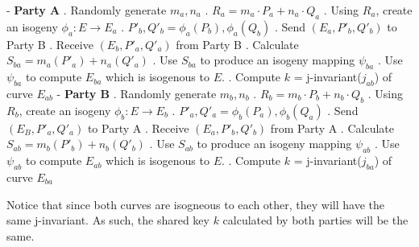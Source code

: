 \documentclass[10pt,twocolumn]{article} %
\begin{document}
- \textbf{Party A} 
. Randomly generate $ m_{a},n_{a}$
. $R_{a} = m_{a}\cdot P_{a}+n_{a}\cdot Q_{a}$
. Using $R_{a}$, create an isogeny $\phi_{a}: E \rightarrow E_{a}$
. $P'_{b},Q'_{b}=\phi_{a}(P_{b}),\phi_{a}(Q_{b})$
. Send $(E_{a}, P'_{b}, Q'_{b})$ to Party B
. Receive $(E_b, P'_a, Q'_a)$ from Party B
. Calculate $S_{ba} = m_a(P'_a)+n_a(Q'_a)$ 
. Use $S_{ba}$ to produce an isogeny mapping $\psi_{ba}$
. Use $\psi_{ba}$ to compute $E_{ba}$ which is isogenous to $E$.
. Compute $k$ = j-invariant($j_{ab}$) of curve $E_{ab}$
\newline
\newline
- \textbf{Party B}
. Randomly generate $ m_{b},n_{b}$
. $R_{b} = m_{b}\cdot P_{b}+n_{b}\cdot Q_{b}$
. Using $R_{b}$, create an isogeny $\phi_{b}: E \rightarrow E_{b}$
. $P'_{a},Q'_{a}=\phi_{b}(P_{a}),\phi_{b}(Q_{a})$
. Send $(E_B, P'_{a}, Q'_{a})$ to Party A
. Receive $(E_a, P'_b, Q'_b)$ from Party A
. Calculate $S_{ab} = m_b(P'_b)+n_b(Q'_b)$ 
. Use $S_{ab}$ to produce an isogeny mapping $\psi_{ab}$
. Use $\psi_{ab}$ to compute $E_{ab}$ which is isogenous to $E$.
. Compute $k$ = j-invariant($j_{ba}$) of curve $E_{ba}$
\newline

\par Notice that since both curves are isogneous to each other, they will have the same j-invariant. As such, the shared key $k$ calculated by both parties will be the same.
\end{document}
